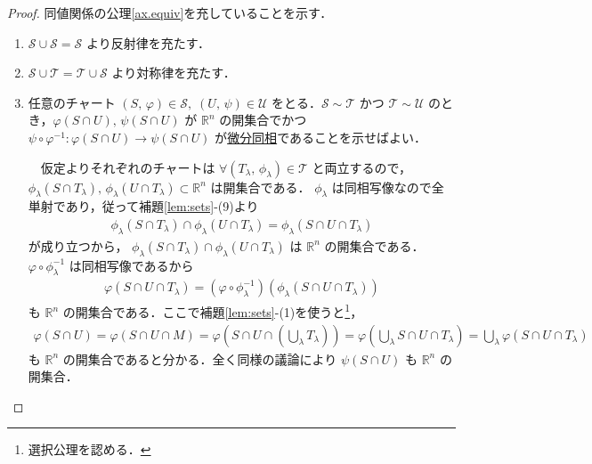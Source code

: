 \documentclass[geometry_main]{subfiles}
\begin{document}
\begin{proof}
	同値関係の公理\ref{ax.equiv}を充していることを示す．
	\begin{enumerate}
		\item $\mathcal{S} \cup \mathcal{S} = \mathcal{S}$ より反射律を充たす．
		\item $\mathcal{S} \cup \mathcal{T} = \mathcal{T} \cup \mathcal{S}$ より対称律を充たす．
		\item 任意のチャート $(S,\, \varphi) \in \mathcal{S},\; (U,\, \psi) \in \mathcal{U}$ をとる．$\mathcal{S} \sim \mathcal{T}$ かつ $\mathcal{T} \sim \mathcal{U}$ のとき，$\varphi(S \cap U),\, \psi(S \cap U)$ が $\mathbb{R}^n$ の開集合でかつ $\psi \circ \varphi^{-1} \colon \varphi(S \cap U) \to \psi(S \cap U)$ が\hyperref[def.diffeomo]{微分同相}であることを示せばよい．
		
		　仮定よりそれぞれのチャートは $\forall (T_\lambda,\, \phi_\lambda) \in \mathcal{T}$ と両立するので，$\phi_\lambda(S \cap T_\lambda),\, \phi_\lambda (U \cap T_\lambda) \subset \mathbb{R}^n$ は開集合である．
		$\phi_\lambda$ は同相写像なので全単射であり，従って補題\ref{lem:sets}-(9)より
		\begin{align}
			\phi_\lambda(S \cap T_\lambda) \cap \phi_\lambda (U \cap T_\lambda) = \phi_\lambda (S \cap U \cap T_\lambda) 
		\end{align}
		が成り立つから， $\phi_\lambda(S \cap T_\lambda) \cap \phi_\lambda (U \cap T_\lambda) $ は $\mathbb{R}^n$ の開集合である．
		$\varphi \circ \phi_\lambda^{-1}$ は同相写像であるから
		\begin{align}
			\varphi(S \cap U \cap T_\lambda) = (\varphi \circ \phi_\lambda^{-1})(\phi_\lambda (S \cap U \cap T_\lambda))
		\end{align}
		も $\mathbb{R}^n$ の開集合である．ここで補題\ref{lem:sets}-(1)を使うと\footnote{選択公理を認める．}，
		\begin{align}
			\varphi(S \cap U) = \varphi(S \cap U \cap M) =  \varphi \left(S \cap U \cap \left(\bigcup_\lambda T_\lambda\right)\right) = \varphi \left(\bigcup_\lambda S \cap U \cap T_\lambda\right) = \bigcup_\lambda \varphi(S \cap U \cap T_\lambda)
		\end{align}
		も $\mathbb{R}^n$ の開集合であると分かる．全く同様の議論により $\psi (S \cap U)$ も $\mathbb{R}^n$ の開集合．


\end{enumerate}
\end{proof}
\end{document}
